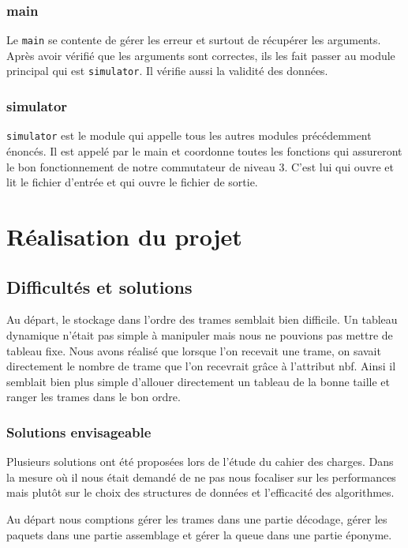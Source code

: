 \documentclass[a4paper,11pt]{article}
\begin{document}
\subsubsection{main}
Le \texttt{main} se contente de gérer les erreur et surtout de récupérer les arguments. Après avoir vérifié que les arguments sont correctes, ils les fait passer au module principal qui est \texttt{simulator}. Il vérifie aussi la validité des données.

\subsubsection{simulator}
\texttt{simulator} est le module qui appelle tous les autres modules précédemment énoncés. Il est appelé par le main et coordonne toutes les fonctions qui assureront le bon fonctionnement de notre commutateur de niveau 3. C'est lui qui ouvre et lit le fichier d'entrée et qui ouvre le fichier de sortie.


\section{Réalisation du projet}

\subsection{Difficultés et solutions}

Au départ, le stockage dans l'ordre des trames semblait bien difficile. Un tableau dynamique n'était pas simple à manipuler mais nous ne pouvions pas mettre de tableau fixe. Nous avons réalisé que lorsque l'on recevait une trame, on savait directement le nombre de trame que l'on recevrait grâce à l’attribut nbf. Ainsi il semblait bien plus simple d'allouer directement un tableau de la bonne taille et ranger les trames dans le bon ordre.

\subsubsection{Solutions envisageable}

Plusieurs solutions ont été proposées lors de l'étude du cahier des charges. Dans la mesure où il nous était demandé de ne pas nous focaliser sur les performances mais plutôt sur le choix des structures de données et l'efficacité des algorithmes.

Au départ nous comptions gérer les trames dans une partie décodage, gérer les paquets dans une partie assemblage et gérer la queue dans une partie éponyme.
 
\end{document}

